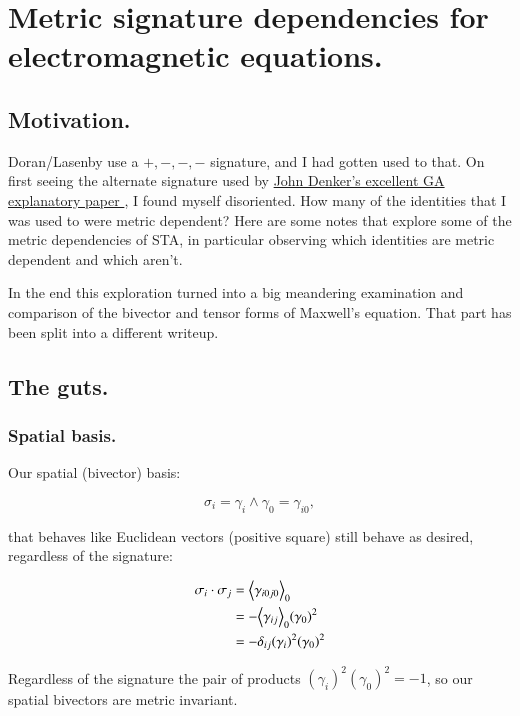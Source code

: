 \chapter{ Metric signature dependencies for electromagnetic equations.}

\section{Motivation. }

Doran/Lasenby use a $+,-,-,-$ signature, and I had gotten used to that.  On first seeing the alternate signature used by 
\href{http://www.av8n.com/physics/maxwell-ga.pdf}{ John Denker's excellent GA explanatory paper }, 
I found myself disoriented.  How many of the identities that I was used to were metric dependent?   Here are some notes that explore some of the
metric dependencies of STA, in particular observing which identities are metric dependent and which aren't.

In the end this exploration turned into a big meandering examination and comparison of the bivector and tensor forms of Maxwell's equation.  That part has been split into a different writeup.

\section{The guts. }

\subsection{Spatial basis. }

Our spatial (bivector) basis:

\begin{equation*}
\sigma_i = \gamma_i \wedge \gamma_0 = \gamma_{i0},
\end{equation*}

that behaves like Euclidean vectors (positive square) still behave as desired, regardless of the signature:

\begin{align*}
\sigma_i \cdot \sigma_j
&= {\left\langle{{\gamma_{i0j0}}}\right\rangle}_{0}  \\
&= - {\left\langle{{\gamma_{ij}}}\right\rangle}_{0} (\gamma_{0})^2  \\
&= -\delta_{ij} (\gamma_i)^2 (\gamma_{0})^2
\end{align*}

Regardless of the signature the pair of products $(\gamma_i)^2 (\gamma_{0})^2 = -1$, so our spatial bivectors are metric invariant.

